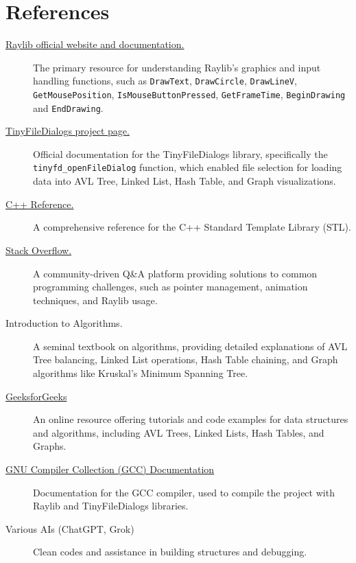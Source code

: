 \documentclass{article}
\begin{document}
\section{References}
\begin{description}
	\item[\href{https://www.raylib.com/}{Raylib official website and documentation.}] The primary resource for understanding Raylib's graphics and input handling functions, such as \lstinline|DrawText|, \lstinline|DrawCircle|, \lstinline|DrawLineV|, \lstinline|GetMousePosition|, \lstinline|IsMouseButtonPressed|, \lstinline|GetFrameTime|, \lstinline|BeginDrawing| and \lstinline|EndDrawing|.
	\item[\href{https://sourceforge.net/projects/tinyfiledialogs/}{TinyFileDialogs project page.}] Official documentation for the TinyFileDialogs library, specifically the \lstinline|tinyfd_openFileDialog| function, which enabled file selection for loading data into AVL Tree, Linked List, Hash Table, and Graph visualizations.
	\item[\href{https://en.cppreference.com/w/}{C++ Reference.}] A comprehensive reference for the C++ Standard Template Library (STL).
	\item[\href{https://stackoverflow.com/}{Stack Overflow.}] A community-driven Q\&A platform providing solutions to common programming challenges, such as pointer management, animation techniques, and Raylib usage.
	\item[Introduction to Algorithms.] A seminal textbook on algorithms, providing detailed explanations of AVL Tree balancing, Linked List operations, Hash Table chaining, and Graph algorithms like Kruskal's Minimum Spanning Tree.
	\item[\href{https://www.geeksforgeeks.org/}{GeeksforGeeks}] An online resource offering tutorials and code examples for data structures and algorithms, including AVL Trees, Linked Lists, Hash Tables, and Graphs.
	\item[\href{https://gcc.gnu.org/onlinedocs/}{GNU Compiler Collection (GCC) Documentation}] Documentation for the GCC compiler, used to compile the project with Raylib and TinyFileDialogs libraries.
	\item[Various AIs (ChatGPT, Grok)] Clean codes and assistance in building structures and debugging. 
\end{description}
\end{document}
